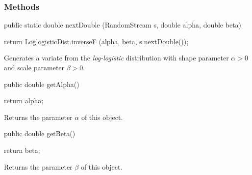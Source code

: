 \subsubsection* {Methods}
\begin{code}    

   public static double nextDouble (RandomStream s,
                                    double alpha, double beta)\begin{hide} {
      return LoglogisticDist.inverseF (alpha, beta, s.nextDouble());
   }\end{hide}
\end{code}
\begin{tabb} Generates a variate from the {\em log-logistic\/} distribution
   with shape parameter $\alpha > 0$ and scale parameter $\beta > 0$.
\end{tabb}
\begin{code}

   public double getAlpha()\begin{hide} {
      return alpha;
   }\end{hide}
\end{code}
  \begin{tabb} Returns the parameter $\alpha$ of this object.
  \end{tabb}
\begin{code}

   public double getBeta()\begin{hide} {
      return beta;
   }\end{hide}
\end{code}
  \begin{tabb} Returns the parameter $\beta$ of this object.
  \end{tabb}
\begin{code}\begin{hide}

   protected void setParams (double alpha, double beta) {
      if (alpha <= 0.0)
         throw new IllegalArgumentException ("alpha <= 0");
      if (beta <= 0.0)
         throw new IllegalArgumentException ("beta <= 0");
      this.alpha = alpha;
      this.beta = beta;
   }
}\end{hide}
\end{code}
